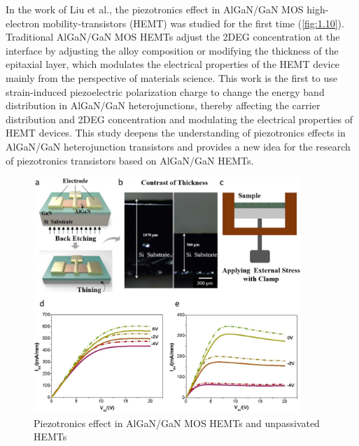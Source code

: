 In the work of Liu et al., the piezotronics effect in AlGaN/GaN MOS high-electron mobility-transistors (HEMT) \cite{liu2017electrical,Liu2018flexible} was studied for the first time (\autoref{fig:1.10}). Traditional AlGaN/GaN MOS HEMTs adjust the 2DEG concentration  at the interface  by adjusting the alloy composition or modifying the thickness of the epitaxial  layer, which modulates  the electrical properties of the HEMT  device mainly from the perspective of materials science. This work is the first to use strain-induced  piezoelectric polarization charge  to change the energy band  distribution in AlGaN/GaN heterojunctions, thereby affecting the carrier distribution  and 2DEG concentration  and modulating the electrical properties of HEMT devices. This study deepens the understanding of piezotronics  effects in AlGaN/GaN heterojunction transistors and provides a new idea for the research of piezotronics  transistors based on AlGaN/GaN HEMTs.

\begin{figure}[H] 
\centering    
\includegraphics[width=0.9\textwidth]{ch1_10}
\caption[Piezotronics effect in AlGaN/GaN MOS HEMTs and unpassivated HEMTs]{Piezotronics effect in AlGaN/GaN MOS HEMTs and unpassivated HEMTs \protect\cite{liu2017electrical}}
\label{fig:1.10}
\end{figure}

